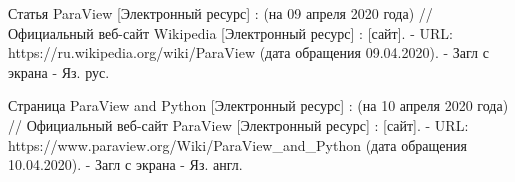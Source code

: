 \documentclass[14pt]{extreport}
\begin{document}
\begin{thebibliography}{9}
   Статья ParaView [Электронный ресурс] : (на 09 апреля 2020 года) // Официальный веб-сайт Wikipedia [Электронный ресурс] : [сайт]. - URL: https://ru.wikipedia.org/wiki/ParaView (дата обращения 09.04.2020). - Загл с экрана - Яз. рус.
   
   Страница ParaView and Python [Электронный ресурс] : (на 10 апреля 2020 года) // Официальный веб-сайт ParaView [Электронный ресурс] : [сайт]. - URL: https://www.paraview.org/Wiki/ParaView\_and\_Python (дата обращения 10.04.2020). - Загл с экрана - Яз. англ.
\end{thebibliography}


\end{document}
